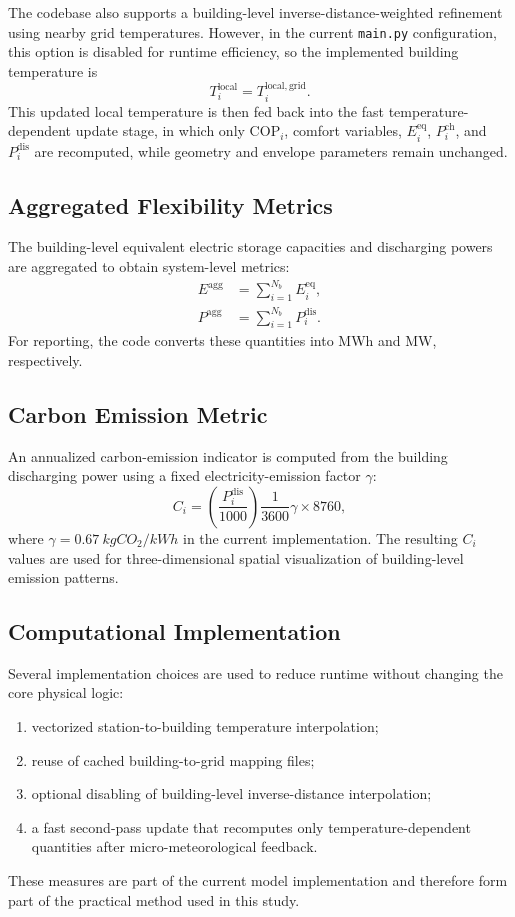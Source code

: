 \documentclass[conference]{IEEEtran}
\begin{document}
The codebase also supports a building-level inverse-distance-weighted refinement using nearby grid temperatures. However, in the current \texttt{main.py} configuration, this option is disabled for runtime efficiency, so the implemented building temperature is
\begin{equation}
    T^{\mathrm{local}}_i = T^{\mathrm{local,grid}}_i.
\end{equation}
This updated local temperature is then fed back into the fast temperature-dependent update stage, in which only $\mathrm{COP}_i$, comfort variables, $E^{\mathrm{eq}}_i$, $P^{\mathrm{ch}}_i$, and $P^{\mathrm{dis}}_i$ are recomputed, while geometry and envelope parameters remain unchanged.

\subsection{Aggregated Flexibility Metrics}
The building-level equivalent electric storage capacities and discharging powers are aggregated to obtain system-level metrics:
\begin{align}
    E^{\mathrm{agg}} &= \sum_{i=1}^{N_b} E^{\mathrm{eq}}_i, \\
    P^{\mathrm{agg}} &= \sum_{i=1}^{N_b} P^{\mathrm{dis}}_i.
\end{align}
For reporting, the code converts these quantities into \si{MWh} and \si{MW}, respectively.

\subsection{Carbon Emission Metric}
An annualized carbon-emission indicator is computed from the building discharging power using a fixed electricity-emission factor $\gamma$:
\begin{equation}
    C_i =
    \left(
    \frac{P^{\mathrm{dis}}_i}{1000}
    \right)
    \frac{1}{3600}
    \gamma
    \times 8760,
\end{equation}
where $\gamma=\SI{0.67}{kgCO_2/kWh}$ in the current implementation. The resulting $C_i$ values are used for three-dimensional spatial visualization of building-level emission patterns.

\subsection{Computational Implementation}
Several implementation choices are used to reduce runtime without changing the core physical logic:
\begin{enumerate}
    \item vectorized station-to-building temperature interpolation;
    \item reuse of cached building-to-grid mapping files;
    \item optional disabling of building-level inverse-distance interpolation;
    \item a fast second-pass update that recomputes only temperature-dependent quantities after micro-meteorological feedback.
\end{enumerate}
These measures are part of the current model implementation and therefore form part of the practical method used in this study.
\end{document}
